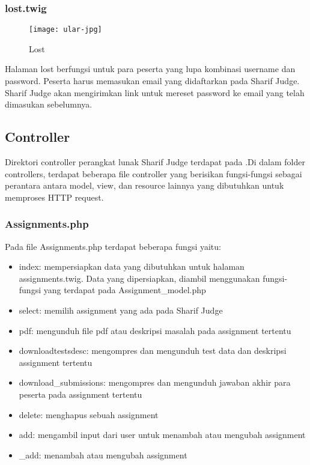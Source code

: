 \subsubsection{lost.twig}
\begin{figure}[H]
	\centering  
	\texttt{[image: ular-jpg]}  
	\caption[Lost]{Lost} 
	\label{fig:lost} 
\end{figure} 
Halaman lost berfungsi untuk para peserta yang lupa kombinasi username dan password. Peserta harus memasukan email yang didaftarkan pada Sharif Judge. Sharif Judge akan mengirimkan link untuk mereset password ke email yang telah dimasukan sebelumnya.

\subsection{Controller}
Direktori controller perangkat lunak Sharif Judge terdapat pada .Di dalam folder controllers, terdapat beberapa file controller yang berisikan fungsi-fungsi sebagai perantara antara model, view, dan resource lainnya yang dibutuhkan untuk memproses HTTP request.

\subsubsection{Assignments.php}
Pada file Assignments.php terdapat beberapa fungsi yaitu:
\begin{itemize}
	\item index: mempersiapkan data yang dibutuhkan untuk halaman assignments.twig. Data yang dipersiapkan, diambil menggunakan fungsi-fungsi yang terdapat pada Assignment\_model.php
	\item select: memilih assignment yang ada pada Sharif Judge
	\item pdf: mengunduh file pdf atau deskripsi masalah pada assignment tertentu
	\item downloadtestsdesc: mengompres dan mengunduh test data dan deskripsi assignment tertentu
	\item download\_submissions: mengompres dan mengunduh jawaban akhir para peserta pada assignment tertentu
	\item delete: menghapus sebuah assignment
	\item add: mengambil input dari user untuk menambah atau mengubah assignment
	\item \_add: menambah atau mengubah assignment
\end{itemize}

